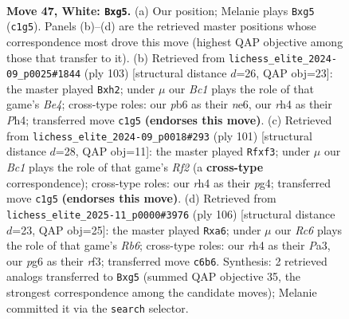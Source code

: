 \documentclass[11pt]{article}
\begin{document}
\clearpage

\begin{figure}[p]\centering
\begin{subfigure}{0.46\textwidth}\centering
\resizebox{\linewidth}{!}{%
\newchessgame
\chessboard[
  setfen={4k3/8/1pR3p1/6p1/rp1P3r/3K4/8/2B5 w - - 3 47},
  showmover=false,
  pgfstyle=straightmove, color=movearrow, markmove={c1-g5}
]}
\caption{}
\end{subfigure}\hfill
\begin{subfigure}{0.46\textwidth}\centering
\resizebox{\linewidth}{!}{%
\newchessgame
\chessboard[
  setfen={8/3K4/r3N3/2P1b3/4k2p/P7/P6P/3R4 b - - 0 52},
  showmover=false,
  pgfstyle=straightmove, color=movearrow, markmove={e5-h2}
]}
\caption{}
\end{subfigure}
\\[4pt]
\begin{subfigure}{0.46\textwidth}\centering
\resizebox{\linewidth}{!}{%
\newchessgame
\chessboard[
  setfen={8/5r1k/R6P/8/6P1/pr3P2/7K/8 b - - 0 51},
  showmover=false,
  pgfstyle=straightmove, color=movearrow, markmove={f7-f3}
]}
\caption{}
\end{subfigure}\hfill
\begin{subfigure}{0.46\textwidth}\centering
\resizebox{\linewidth}{!}{%
\newchessgame
\chessboard[
  setfen={8/8/pR6/3k3p/2p2p2/P4r2/8/2BK4 w - - 0 54},
  showmover=false,
  pgfstyle=straightmove, color=movearrow, markmove={b6-a6}
]}
\caption{}
\end{subfigure}
\caption{\textbf{Move 47, White: \texttt{Bxg5}.} (a) Our position; Melanie plays \texttt{Bxg5} (\texttt{c1g5}). Panels (b)--(d) are the retrieved master positions whose correspondence most drove this move (highest QAP objective among those that transfer to it). (b) Retrieved from \texttt{lichess\_elite\_2024-09\_p0025\#1844} (ply 103) [structural distance $d$=26, QAP obj=23]: the master played \texttt{Bxh2}; under $\mu$ our \emph{Bc1} plays the role of that game's \emph{Be4}; cross-type roles: our \emph{p}b6 as their \emph{n}e6, our \emph{r}h4 as their \emph{P}h4; transferred move \texttt{c1g5} \textbf{(endorses this move)}. (c) Retrieved from \texttt{lichess\_elite\_2024-09\_p0018\#293} (ply 101) [structural distance $d$=28, QAP obj=11]: the master played \texttt{Rfxf3}; under $\mu$ our \emph{Bc1} plays the role of that game's \emph{Rf2} (a \textbf{cross-type} correspondence); cross-type roles: our \emph{r}h4 as their \emph{p}g4; transferred move \texttt{c1g5} \textbf{(endorses this move)}. (d) Retrieved from \texttt{lichess\_elite\_2025-11\_p0000\#3976} (ply 106) [structural distance $d$=23, QAP obj=25]: the master played \texttt{Rxa6}; under $\mu$ our \emph{Rc6} plays the role of that game's \emph{Rb6}; cross-type roles: our \emph{r}h4 as their \emph{P}a3, our \emph{p}g6 as their \emph{r}f3; transferred move \texttt{c6b6}. Synthesis: 2 retrieved analogs transferred to \texttt{Bxg5} (summed QAP objective 35, the strongest correspondence among the candidate moves); Melanie committed it via the \texttt{search} selector.}
\label{fig:thought-m92}
\end{figure}
\end{document}
